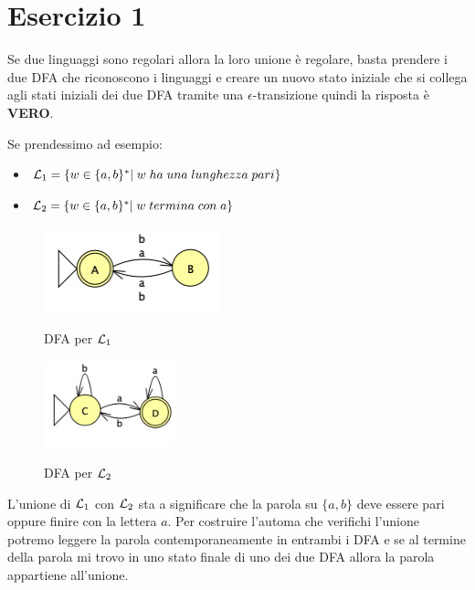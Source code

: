 \documentclass[11pt]{article}
\begin{document}
\section*{Esercizio 1}
Se due linguaggi sono regolari allora la loro unione è regolare, 
basta prendere i due DFA che riconoscono i linguaggi e creare un nuovo
stato iniziale che si collega agli stati iniziali dei due DFA tramite
una $\epsilon$-transizione quindi la risposta è \textbf{VERO}.
\begin{tcolorbox}[colframe=orange!70!black, colback=orange!10!white, title=\textbf{\textit{Nota \sout{inutile ai fini dell'esercizio}:}}]
Se prendessimo ad esempio:
\begin{itemize}
  \item ${\cal L}_1 = \{w \in \{a,b\}^*|\;w\;ha\;una\;lunghezza\;pari\}$  
  \item ${\cal L}_2 = \{w \in \{a,b\}^*|\;w\;termina\;con\;a\}$  
\end{itemize}
\begin{multicols}{2}
  \begin{figure}[H]
  \centering
    \includegraphics[height=2.5cm]{img/01Pari.png}
    \label{fig:01-DFA-pari}
    \caption*{DFA per ${\cal L}_1$}
  \end{figure}
  \begin{figure}[H]
  \centering
    \includegraphics[height=2.5cm]{img/01FinisceConA.png}
    \label{fig:01-DFA-finisce-con-a}
    \caption*{DFA per ${\cal L}_2$}
  \end{figure}
\end{multicols}
L'unione di  ${\cal L}_1$ con  ${\cal L}_2$ sta a significare che la 
parola su $\{a, b\}$ deve essere pari oppure finire con la lettera $a$.
Per costruire l'automa che verifichi l'unione potremo leggere la parola
contemporaneamente in entrambi i DFA e se al termine della parola mi 
trovo in uno stato finale di uno dei due DFA allora la parola appartiene
all'unione.


\end{tcolorbox}
\end{document}
